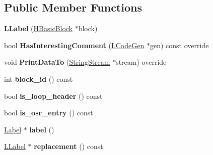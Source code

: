 \subsection*{Public Member Functions}
\begin{DoxyCompactItemize}
\item 
{\bfseries L\+Label} (\hyperlink{classv8_1_1internal_1_1_h_basic_block}{H\+Basic\+Block} $\ast$block)\hypertarget{classv8_1_1internal_1_1_l_label_aa8ea13a89f3934f66742778ba3f83cd4}{}\label{classv8_1_1internal_1_1_l_label_aa8ea13a89f3934f66742778ba3f83cd4}

\item 
bool {\bfseries Has\+Interesting\+Comment} (\hyperlink{classv8_1_1internal_1_1_l_code_gen}{L\+Code\+Gen} $\ast$gen) const  override\hypertarget{classv8_1_1internal_1_1_l_label_aa0a8236af4aaa8c0433e5082df86d31a}{}\label{classv8_1_1internal_1_1_l_label_aa0a8236af4aaa8c0433e5082df86d31a}

\item 
void {\bfseries Print\+Data\+To} (\hyperlink{classv8_1_1internal_1_1_string_stream}{String\+Stream} $\ast$stream) override\hypertarget{classv8_1_1internal_1_1_l_label_ac1318b8f414140c11ee85e3acd00491f}{}\label{classv8_1_1internal_1_1_l_label_ac1318b8f414140c11ee85e3acd00491f}

\item 
int {\bfseries block\+\_\+id} () const \hypertarget{classv8_1_1internal_1_1_l_label_a87739f07ada487049bd402d117ea0bdc}{}\label{classv8_1_1internal_1_1_l_label_a87739f07ada487049bd402d117ea0bdc}

\item 
bool {\bfseries is\+\_\+loop\+\_\+header} () const \hypertarget{classv8_1_1internal_1_1_l_label_a310f97c551f5ab43f42ef04d2b97b349}{}\label{classv8_1_1internal_1_1_l_label_a310f97c551f5ab43f42ef04d2b97b349}

\item 
bool {\bfseries is\+\_\+osr\+\_\+entry} () const \hypertarget{classv8_1_1internal_1_1_l_label_a2a98f2b24dada94a6a1e4f78b0cb88be}{}\label{classv8_1_1internal_1_1_l_label_a2a98f2b24dada94a6a1e4f78b0cb88be}

\item 
\hyperlink{classv8_1_1internal_1_1_label}{Label} $\ast$ {\bfseries label} ()\hypertarget{classv8_1_1internal_1_1_l_label_aad0d2d6e266d7d6ee11d0d4d2e4342c8}{}\label{classv8_1_1internal_1_1_l_label_aad0d2d6e266d7d6ee11d0d4d2e4342c8}

\item 
\hyperlink{classv8_1_1internal_1_1_l_label}{L\+Label} $\ast$ {\bfseries replacement} () const \hypertarget{classv8_1_1internal_1_1_l_label_aeae2ce751911693b33505ace069c9f38}{}\label{classv8_1_1internal_1_1_l_label_aeae2ce751911693b33505ace069c9f38}


\end{DoxyCompactItemize}
